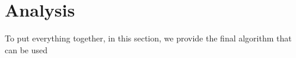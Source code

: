 \section{Analysis}
To put everything together, in this section, we provide the final algorithm that can be used 